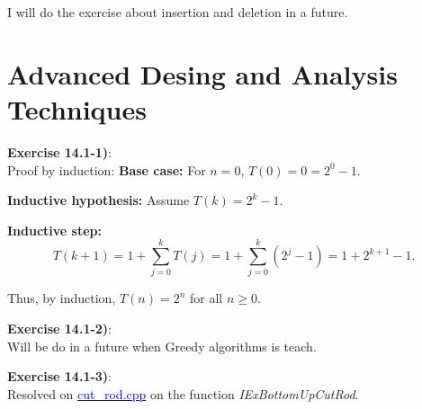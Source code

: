 \documentclass{article}
\newcounter{exercise}[section]   %
\begin{document}
I will do the exercise about insertion and deletion in a future.

\section{Advanced Desing and Analysis Techniques}
\setcounter{exercise}{0}

\textbf{Exercise 14.1-1)}:\\
Proof by induction:
\textbf{Base case:} For \( n = 0 \), \( T(0) = 0 = 2^0 - 1 \).

\textbf{Inductive hypothesis:} Assume \( T(k) = 2^k - 1 \).

\textbf{Inductive step:}
\[
T(k+1) = 1 + \sum_{j=0}^{k} T(j) = 1 + \sum_{j=0}^{k} (2^j - 1) = 1 + 2^{k+1} - 1.
\]

Thus, by induction, \( T(n) = 2^n \) for all \( n \geq 0 \).

\textbf{Exercise 14.1-2)}:\\
Will be do in a future when Greedy algorithms is teach.

\textbf{Exercise 14.1-3)}:\\
Resolved on \href{https://github.com/Graburr/Algorithms_CLRS_4ed_solutions/tree/main/chapter4/Dinamyc_Programing/cut_rod.cpp}
{\textcolor{Blue}{cut\_rod.cpp}} on the function \textit{IExBottomUpCutRod}.
\end{document}
